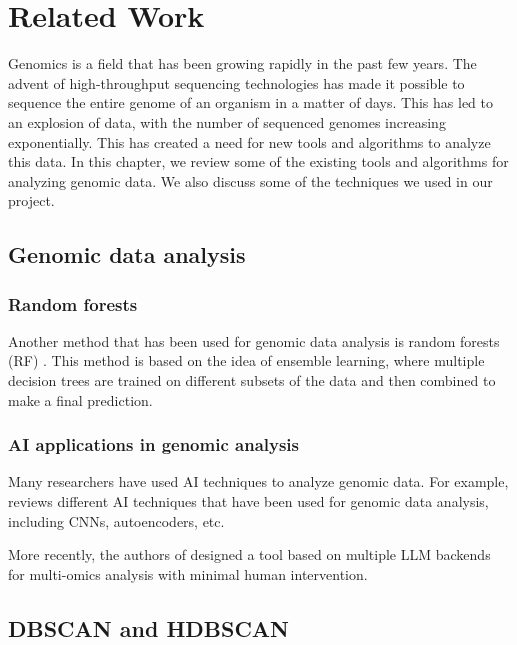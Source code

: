 \chapter{Related Work}
\label{chap:related-work}

Genomics is a field that has been growing rapidly in the past few years. The advent of high-throughput
sequencing technologies has made it possible to sequence the entire genome of an organism in a matter
of days. This has led to an explosion of data, with the number of sequenced genomes increasing exponentially.
This has created a need for new tools and algorithms to analyze this data. In this chapter, we review
some of the existing tools and algorithms for analyzing genomic data. We also discuss some of the techniques
we used in our project.

\section{Genomic data analysis}
\label{sec:genomic-data-analysis}

\subsection*{Random forests}
\label{subsec:random-forests}

Another method that has been used for genomic data analysis is random forests (RF) \cite{Chen-Ishwaran-2012}.
This method is based on the idea of ensemble learning, where multiple decision trees are trained on different
subsets of the data and then combined to make a final prediction.

\subsection*{AI applications in genomic analysis}
\label{sec:ai-applications-in-genomic-analysis}

Many researchers have used AI techniques to analyze genomic data. For example, \cite{Caudai-et-al-2021} reviews
different AI techniques that have been used for genomic data analysis, including CNNs, autoencoders, etc.

More recently, the authors of \cite{Zhou-et-al-2024} designed a tool based on multiple LLM backends for multi-omics
analysis with minimal human intervention.

\section{DBSCAN and HDBSCAN}
\label{sec:principle_dbscan_hdbscan}


